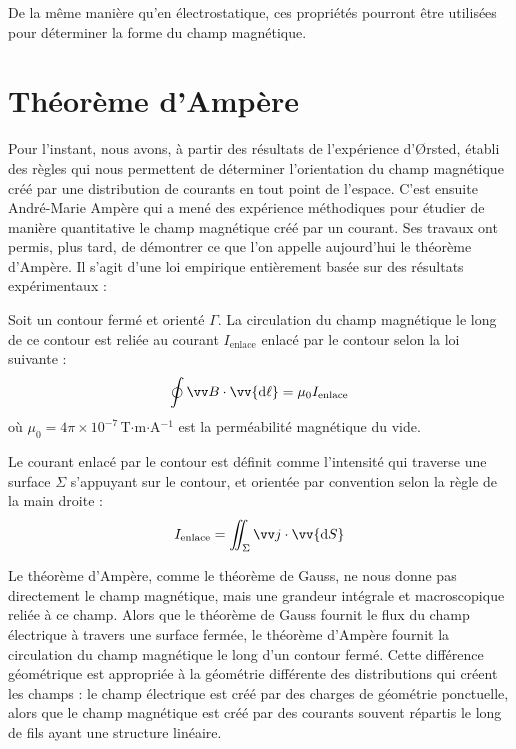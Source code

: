 \documentclass[11pt,fleqn]{book} %
\newcommand{\dd}{\mathrm{d}}
\begin{document}
De la même manière qu'en électrostatique, ces propriétés pourront être utilisées pour déterminer la forme du champ magnétique. 

\section{Théorème d'Ampère}

Pour l'instant, nous avons, à partir des résultats de l'expérience d'{\O}rsted, établi des règles qui nous permettent de déterminer l'orientation du champ magnétique créé par une distribution de courants en tout point de l'espace. C'est ensuite André-Marie Ampère qui a mené des expérience méthodiques pour étudier de manière quantitative le champ magnétique créé par un courant. Ses travaux ont permis, plus tard, de démontrer ce que l'on appelle aujourd'hui le théorème d'Ampère. Il s'agit d'une loi empirique entièrement basée sur des résultats expérimentaux :
\begin{theorem}
    Soit un contour fermé et orienté $\Gamma$. La circulation du champ magnétique le long de ce contour est reliée au courant $I_{\mathrm{enlace}}$ enlacé par le contour selon la loi suivante :
    \begin{equation}
        \oint \vv B \cdot \vv{\dd \ell} = \mu_0 I_{\mathrm{enlace}}
    \end{equation}
    où $\mu_0 = 4 \pi \times 10^{-7}\,$T$\cdot$m$\cdot$A$^{-1}$ est la perméabilité magnétique du vide.
\end{theorem}

Le courant enlacé par le contour est définit comme l'intensité qui traverse une surface $\Sigma$ s'appuyant sur le contour, et orientée par convention selon la règle de la main droite :
\begin{equation}
    I_{\mathrm{enlace}} = \iint_\Sigma \vv j \cdot \vv{\dd S}
\end{equation}

Le théorème d'Ampère, comme le théorème de Gauss, ne nous donne pas directement le champ magnétique, mais une grandeur intégrale et macroscopique reliée à ce champ. Alors que le théorème de Gauss fournit le flux du champ électrique à travers une surface fermée, le théorème d'Ampère fournit la circulation du champ magnétique le long d'un contour fermé. Cette différence géométrique est appropriée à la géométrie différente des distributions qui créent les champs : le champ électrique est créé par des charges de géométrie ponctuelle, alors que le champ magnétique est créé par des courants souvent répartis le long de fils ayant une structure linéaire.
\end{document}
